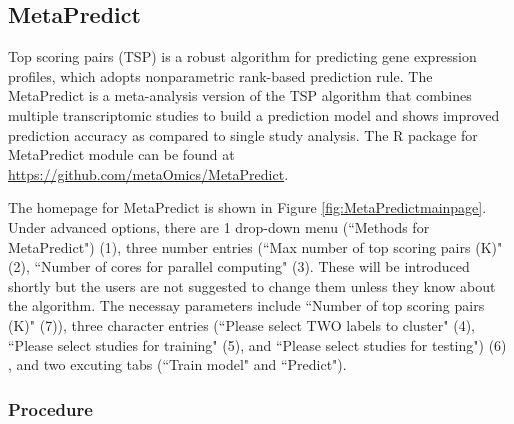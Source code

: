 \subsection{MetaPredict}

Top scoring pairs (TSP) is a robust algorithm for predicting gene expression profiles,
which adopts nonparametric rank-based prediction rule.
The MetaPredict is a meta-analysis version of the TSP algorithm that combines multiple transcriptomic studies to build a prediction model and shows improved 
prediction accuracy as compared to single study analysis.
The R package for MetaPredict module can be found at \url{https://github.com/metaOmics/MetaPredict}.

The homepage for MetaPredict is shown in Figure \ref{fig:MetaPredictmainpage}.
Under advanced options,  there are 1 drop-down menu (``Methods for MetaPredict") {\color{red} (1)}, three number entries (``Max number of top scoring pairs (K)" {\color{red} (2)}, ``Number of cores for parallel computing" {\color{red} (3)}.
These will be introduced shortly but the users are not suggested to change them unless they know about the algorithm.
The necessay parameters include ``Number of top scoring pairs (K)" {\color{red} (7)}), three character entries (``Please select TWO labels to cluster" {\color{red} (4)}, ``Please select studies for training" {\color{red} (5)}, and ``Please select studies for testing") {\color{red} (6)} , and two excuting tabs (``Train model" and ``Predict"). 

\subsubsection{Procedure}

